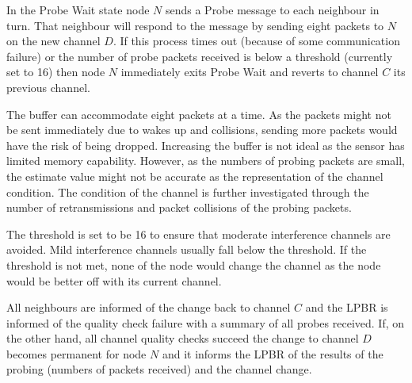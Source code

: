 In the Probe Wait state node $N$ sends a Probe message to each neighbour in turn. That neighbour will respond to the message by sending eight packets to $N$ on the new channel $D$. If this process times out (because of some communication failure) or the number of probe packets received is below a threshold (currently set to 16) then node $N$ immediately exits Probe Wait and reverts to channel $C$ its previous channel. 

The buffer can accommodate eight packets at a time. As the packets might not be sent immediately due to wakes up and collisions, sending more packets would have the risk of being dropped. Increasing the buffer is not ideal as the sensor has limited memory capability. However, as the numbers of probing packets are small, the estimate value might not be accurate as the representation of the channel condition. The condition of the channel is further investigated through the number of retransmissions and packet collisions of the probing packets. 

The threshold is set to be 16 to ensure that moderate interference channels are avoided. Mild interference channels usually fall below the threshold. If the threshold is not met, none of the node would change the channel as the node would be better off with its current channel. 
 


All neighbours are informed of the change back to channel $C$ and the LPBR is informed of the quality check failure with a summary of all probes received.
If, on the other hand, all channel quality checks succeed the change to channel $D$ becomes permanent for node $N$ and it informs the LPBR of the results of the probing (numbers of packets received) and the channel change.

